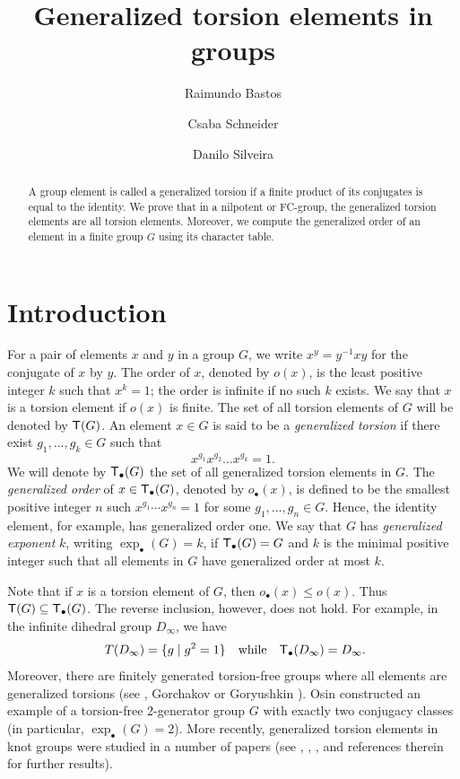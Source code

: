 \documentclass[12pt,leqno]{amsart}
\title[Generalized torsion elements]{Generalized torsion elements in groups}
\author[Bastos]{Raimundo Bastos}
\author[Schneider]{Csaba Schneider}
\author[Silveira]{Danilo Silveira}
\newcommand{\T}{{\sf T}}
\newcommand{\Tg}{{\sf T_{\bullet}}}
\theoremstyle{definition}
\begin{document}
\maketitle
\begin{abstract}
A group element is called a generalized torsion  if a finite product of its conjugates is equal to the identity. 
We prove that in a nilpotent or FC-group, the generalized torsion elements are all  torsion elements.
Moreover, we compute the generalized order of an element in a finite group $G$ using its character table. 
\end{abstract}
\subjclass{}

\maketitle


\section{Introduction}\label{sec:intro}

For a pair of elements $x$ and $y$ in a  group $G$, we write $x^y=y^{-1}xy$ for the conjugate of $x$ by $y$. The order of $x$, denoted by $o(x)$, is the least positive integer $k$ such that $x^k=1$; the order is infinite if no such $k$ exists. We say that $x$ is a torsion element if $o(x)$ is finite. The set of all torsion elements of $G$ will be denoted by $\T(G)$.  An element $x\in G$ is said to be a {\it generalized torsion} if there exist $g_1, \ldots, g_k\in G$ such that $$x^{g_1} x^{g_2} \ldots x^{g_k} =1.$$ 
We will denote by $\Tg(G)$ the set of all generalized torsion elements in $G$. The {\it generalized order} of $x \in \Tg(G)$, denoted by $o_{\bullet}(x)$, is defined to be the smallest  positive integer $n$ such $x^{g_1}\cdots x^{g_n}=1$ for some $g_1,\ldots,g_n\in G$.  Hence, the identity element, for example, has generalized order one. 
We say that $G$ has {\it generalized exponent} $k$, writing $\exp_{\bullet}(G)=k$, if $\Tg(G) = G$ and $k$ is the minimal positive integer such that all elements in $G$ have generalized order at most $k$.

Note that if $x$ is a torsion element of $G$, then $o_{\bullet}(x)\leq o(x)$. Thus  $\T(G) \subseteq \Tg (G)$. The reverse inclusion, however, 
does not hold. For example, in the infinite dihedral group $D_{\infty}$, we have 
\[\
T(D_{\infty}) = \{g \mid g^2=1\}\quad\mbox{while}\quad \Tg(D_{\infty}) = D_{\infty}.
\]
Moreover, there are  finitely generated torsion-free groups  where all elements are generalized torsions (see \cite[Problem 3.11]{KM},  Gorchakov \cite{Gorc} or Goryushkin \cite{Gor}).  Osin \cite[Corollary 1.2]{Osin} constructed an example of a torsion-free 2-generator group $G$ with exactly two  conjugacy classes (in particular, $\exp_{\bullet}(G)=2$).
More recently, generalized torsion elements in knot groups were studied in a number of papers (see \cite{IMM},  \cite{IMM23}, \cite{MT},  \cite{NR}
and references therein for further results).
\end{document}

